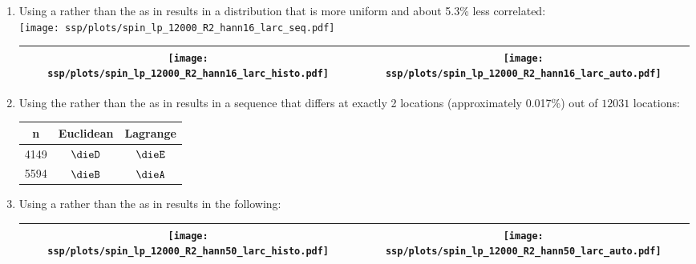 \begin{example}
\begin{enumerate}
  \item \label{item:spin_lp_R2_hann16_larc}
        Using a  rather than the 
         as in 
        results in a distribution that is more uniform and about 5.3\% less correlated:
        \\\texttt{[image: ssp/plots/spin\_lp\_12000\_R2\_hann16\_larc\_seq.pdf]}
     \\\begin{tabular}{|>{\scs}c|>{\scs}c|}
          \hline
          \texttt{[image: ssp/plots/spin\_lp\_12000\_R2\_hann16\_larc\_histo.pdf]}%
         &\texttt{[image: ssp/plots/spin\_lp\_12000\_R2\_hann16\_larc\_auto.pdf]}
        \\\hline
     \end{tabular}

  \item \begin{minipage}[t]{\tw-70mm}%
          Using the  rather than the  as in 
          results in a sequence that differs at exactly 2 locations (approximately 0.017\%) 
          out of $12031$ locations:\footnotemark
        \end{minipage}%
        \hfill{} %
          \begin{tabstr}{0.75}\begin{tabular}[t]{|c|c|c|}
            \hline
              n   & Euclidean & Lagrange
            \\\hline
               4149 & $\dieD$   & $\dieE$
            \\ 5594 & $\dieB$   & $\dieA$
            \\\hline
          \end{tabular}\end{tabstr}%

  \item \label{item:spin_lp_R2_hann50_larc}
        Using a  rather than the 
         as in 
        results in the following:%
     \\\begin{tabular}{|>{\scs}c|>{\scs}c|}
          \hline
          \texttt{[image: ssp/plots/spin\_lp\_12000\_R2\_hann50\_larc\_histo.pdf]}%
         &\texttt{[image: ssp/plots/spin\_lp\_12000\_R2\_hann50\_larc\_auto.pdf]}
        \\\hline
     \end{tabular}


\end{enumerate}
\end{example}
